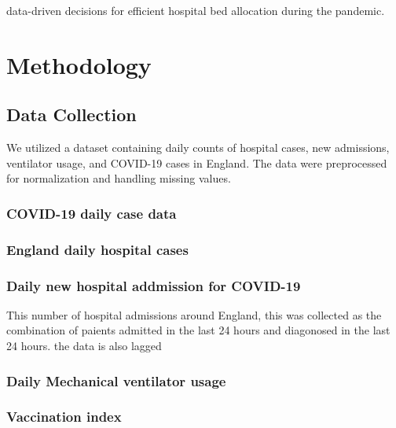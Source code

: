 \documentclass[lettersize, journal]{IEEEtran}
\begin{document}
data-driven decisions for efficient hospital bed allocation during the pandemic.

\section{Methodology}
\subsection{Data Collection}
We utilized a dataset containing daily counts of hospital cases, new admissions, ventilator usage, and COVID-19 cases in England. The data were preprocessed for normalization and handling missing values.

\subsubsection{COVID-19 daily case data}

\subsubsection{England daily hospital cases}

\subsubsection{Daily new hospital addmission for COVID-19}
This number of hospital admissions around England, this was collected as the combination of paients admitted in the last 24 hours and diagonosed in the last 24 hours. the data is also lagged

\subsubsection{Daily Mechanical ventilator usage}

\subsubsection{Vaccination index}
\end{document}
